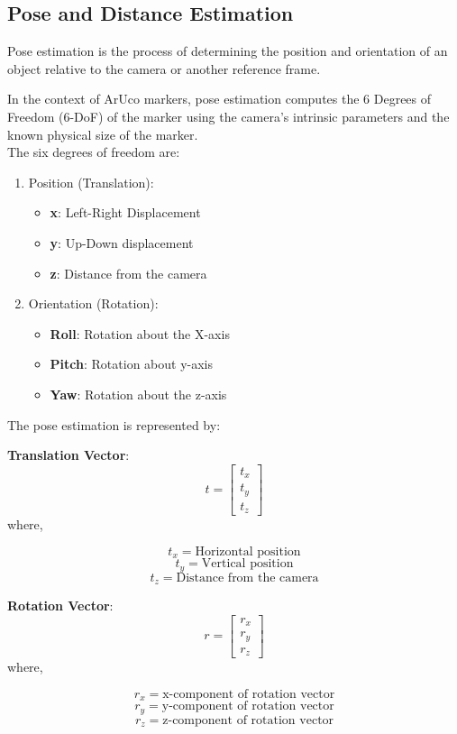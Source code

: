 \documentclass[12pt]{article}
\begin{document}
{\subsection{Pose and Distance Estimation}
Pose estimation is the process of determining the position and orientation of an object relative to the camera or another reference frame.

In the context of ArUco markers, pose estimation computes the 6 Degrees of Freedom (6-DoF) of the marker using the camera's intrinsic parameters and the known physical size of the marker.\\
The six degrees of freedom are:
\begin{enumerate}[label=\roman*.]
\item{Position (Translation):
\begin{itemize}
\item{\textbf{x}: Left-Right Displacement}
\item{\textbf{y}: Up-Down displacement}
\item{\textbf{z}: Distance from the camera}
\end{itemize}
}
\item{Orientation (Rotation):
\begin{itemize}
\item{\textbf{Roll}: Rotation about the X-axis}
\item{\textbf{Pitch}: Rotation about y-axis}
\item{\textbf{Yaw}: Rotation about the z-axis}
\end{itemize}}
\end{enumerate}
\newpage
\thispagestyle{introstyle}
The pose estimation is represented by:

\large{\textbf{Translation Vector}:}
\[
t = \begin{bmatrix}
t_x \\
t_y \\
t_z
\end{bmatrix}
\]
where,

\[t_x = \text{Horizontal position}\]
\[t_y = \text{Vertical position}\]
\[t_z = \text{Distance from the camera}
\]

\large{\textbf{Rotation Vector}:}
\[
r = \begin{bmatrix}
r_x \\
r_y \\
r_z
\end{bmatrix}
\]
where,

\[r_x = \text{x-component of rotation vector}\]
\[r_y = \text{y-component of rotation vector}\]
\[r_z = \text{z-component of rotation vector}\]

}
\end{document}
